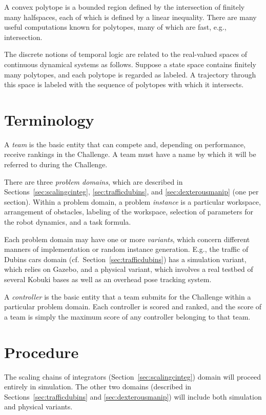 \documentclass{amsart}
\theoremstyle{definition}
\begin{document}
A convex polytope is a bounded region defined by the intersection of finitely
many halfspaces, each of which is defined by a linear inequality.  There are
many useful computations known for polytopes, many of which are fast, e.g.,
intersection. \cite{Fukuda2004}

The discrete notions of temporal logic are related to the real-valued spaces of
continuous dynamical systems as follows.  Suppose a state space contains
finitely many polytopes, and each polytope is regarded as labeled.  A trajectory
through this space is labeled with the sequence of polytopes with which it
intersects.


\section{Terminology}

A \textit{team} is the basic entity that can compete and, depending on
performance, receive rankings in the Challenge.  A team must have a name by
which it will be referred to during the Challenge.

There are three \textit{problem domains}, which are described in
Sections~\ref{sec:scalingcinteg}, \ref{sec:trafficdubins}, and
\ref{sec:dexterousmanip} (one per section).  Within a problem domain, a problem
\textit{instance} is a particular workspace, arrangement of obstacles, labeling
of the workspace, selection of parameters for the robot dynamics, and a task
formula.

Each problem domain may have one or more \textit{variants}, which concern
different manners of implementation or random instance generation.  E.g., the
traffic of Dubins cars domain (cf.\ Section~\ref{sec:trafficdubins}) has a
simulation variant, which relies on Gazebo, and a physical variant, which
involves a real testbed of several Kobuki bases as well as an overhead pose
tracking system.

A \textit{controller} is the basic entity that a team submits for the Challenge
within a particular problem domain.  Each controller is scored and ranked, and
the score of a team is simply the maximum score of any controller belonging to
that team.


\section{Procedure}

The scaling chains of integrators (Section~\ref{sec:scalingcinteg}) domain
will proceed entirely in simulation.  The other two domains (described in
Sections~\ref{sec:trafficdubins} and \ref{sec:dexterousmanip}) will include both
simulation and physical variants.
\end{document}
